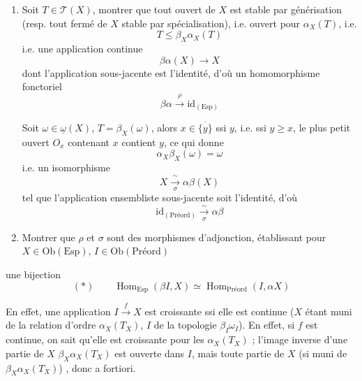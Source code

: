 \documentclass[11pt,a4paper]{article}
\begin{document}
\begin{enumerate}
\item[c)] \struck{\ill{}} Soit $T \in \mathcal{T}(X)$, montrer que tout ouvert de
$X$ est stable par générisation (resp. tout fermé de $X$ stable par
spécialisation), i.e. ouvert pour $\alpha_{X}(T)$, i.e.
\[
T \leq \beta_{X}\alpha_{X}(T)
\]
i.e. une application continue
\[
\beta\alpha(X) \longrightarrow X
\]
dont l'application sous-jacente est l'identité, d'où un homomorphisme fonctoriel
\[
\beta\alpha \xrightarrow{\ \rho\ } \mathrm{id}_{(\mathrm{Esp})}
\]

Soit $\omega \in \underline{\omega}(X)$, \struck{\ill{}} $T = \beta_{X}(\omega)$,
alors $x \in \overline{\{y\}}$ ssi \ill{} $y$, i.e. ssi $y \geq x$, le plus petit
ouvert $O_{x}$ contenant $x$ contient $y$, ce qui donne
\[
\alpha_{X}\beta_{X}(\omega) = \omega
\]
i.e. un isomorphisme
\[
X \xrightarrow[\ \sigma\ ]{\ \sim\ } \alpha\beta(X)
\]
tel que l'application ensembliste sous-jacente soit l'identité, d'où
\[
\mathrm{id}_{(\text{Préord})} \xrightarrow[\ \sigma\ ]{\ \sim\ } \alpha\beta
\]

\item[d)] Montrer que $\rho$ et $\sigma$ sont des morphismes d'adjonction,
\ill{} établissant pour $X \in \mathrm{Ob}(\mathrm{Esp})$,
$I \in \mathrm{Ob}(\text{Préord})$
\end{enumerate}

une bijection
\[
(*) \qquad \operatorname{Hom}_{\mathrm{Esp}}(\beta I, X) \simeq
\operatorname{Hom}_{\text{Préord}}(I, \alpha X)
\]


En effet, une application $I \xrightarrow{f} X$ est croissante ssi elle est
continue ($X$ étant muni de la relation d'ordre $\alpha_{X}(T_{X})$, $I$ de la
topologie $\beta_{I}\omega_{I}$). En effet, si $f$ est continue, on sait qu'elle
est croissante pour les \ill{} $\alpha_{X}(T_{X})$ \ill{} ;  l'image inverse d'une partie de $X$ \ill{} $\beta_{X}\alpha_{X}(T_{X})$
est ouverte dans $I$, mais toute partie de $X$ (si muni de
$\beta_{X}\alpha_{X}(T_{X})$) \ill{}, donc a fortiori.
\end{document}
